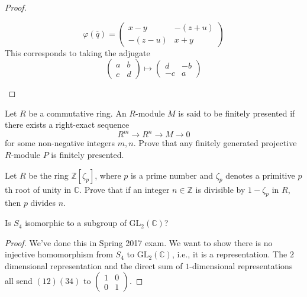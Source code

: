 \documentclass[openany]{book}
\newcommand{\C}{\mathbb{C}}
\begin{document}
\begin{proof}
\begin{itemize}
        \begin{equation*}
            \varphi(\overline{q})=\begin{pmatrix}
                x-y&-(z+u)\\
                -(z-u)&x+y
            \end{pmatrix}
        \end{equation*}
        This corresponds to taking the adjugate 
        \begin{equation*}
            \begin{pmatrix}
                a&b\\
                c&d
            \end{pmatrix}
            \mapsto
            \begin{pmatrix}
                d&-b\\
                -c&a
            \end{pmatrix}
        \end{equation*}
    \end{itemize}
\end{proof}



\begin{prob}
    Let \(R\) be a commutative ring. An \(R\)-module \(M\) is said to be finitely presented if there exists a right-exact sequence
    \[R^m \longrightarrow R^n \longrightarrow M \longrightarrow 0\]
    for some non-negative integers \(m,n\). Prove that any finitely generated projective \(R\)-module \(P\) is finitely presented.
\end{prob}






\begin{prob}
    Let \(R\) be the ring \(\mathbb{Z}[\zeta_p]\), where \(p\) is a prime number and \(\zeta_p\) denotes a primitive \(p\)th root of unity in \(\mathbb{C}\). Prove that if an integer \(n \in \mathbb{Z}\) is divisible by \(1 - \zeta_p\) in \(R\), then \(p\) divides \(n\).
\end{prob}




\begin{prob}
    Is \(S_4\) isomorphic to a subgroup of \(\text{GL}_2(\mathbb{C})\)?
\end{prob}
\begin{proof}
    We've done this in Spring 2017 exam. We want to show there is no injective homomorphism from $S_4$ to $\text{GL}_2(\C)$, i.e., it is a representation. The $2$ dimensional representation and the direct sum of $1$-dimensional representations all send $(12)(34)$ to $\begin{pmatrix}
        1&0\\
        0&1
    \end{pmatrix}$.
\end{proof}
\end{document}
